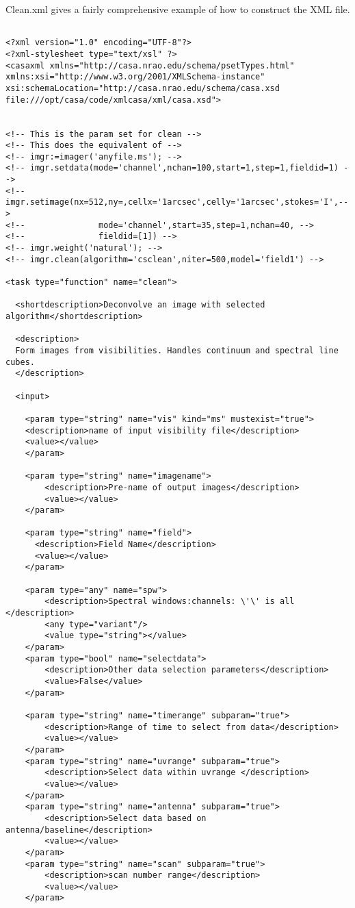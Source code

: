 Clean.xml gives a fairly comprehensive example of how to construct the
XML file.
\begin{verbatim}

<?xml version="1.0" encoding="UTF-8"?>
<?xml-stylesheet type="text/xsl" ?>
<casaxml xmlns="http://casa.nrao.edu/schema/psetTypes.html"
xmlns:xsi="http://www.w3.org/2001/XMLSchema-instance"
xsi:schemaLocation="http://casa.nrao.edu/schema/casa.xsd
file:///opt/casa/code/xmlcasa/xml/casa.xsd">


<!-- This is the param set for clean -->
<!-- This does the equivalent of -->
<!-- imgr:=imager('anyfile.ms'); -->
<!-- imgr.setdata(mode='channel',nchan=100,start=1,step=1,fieldid=1) -->
<!-- imgr.setimage(nx=512,ny=,cellx='1arcsec',celly='1arcsec',stokes='I',-->
<!--               mode='channel',start=35,step=1,nchan=40, -->
<!--               fieldid=[1]) -->
<!-- imgr.weight('natural'); -->
<!-- imgr.clean(algorithm='csclean',niter=500,model='field1') -->

<task type="function" name="clean">

  <shortdescription>Deconvolve an image with selected algorithm</shortdescription>

  <description>
  Form images from visibilities. Handles continuum and spectral line cubes.
  </description>

  <input>

    <param type="string" name="vis" kind="ms" mustexist="true">
    <description>name of input visibility file</description>
    <value></value>
    </param>

    <param type="string" name="imagename">
	    <description>Pre-name of output images</description>
	    <value></value>
    </param>

    <param type="string" name="field">
      <description>Field Name</description>
      <value></value>
    </param>

    <param type="any" name="spw">
	    <description>Spectral windows:channels: \'\' is all </description>
	    <any type="variant"/>
	    <value type="string"></value>
    </param>
    <param type="bool" name="selectdata">
	    <description>Other data selection parameters</description>
	    <value>False</value>
    </param>
    
    <param type="string" name="timerange" subparam="true">
	    <description>Range of time to select from data</description>
	    <value></value>
    </param>
    <param type="string" name="uvrange" subparam="true">
	    <description>Select data within uvrange </description>
	    <value></value>
    </param>
    <param type="string" name="antenna" subparam="true">
	    <description>Select data based on antenna/baseline</description>
	    <value></value>
    </param>
    <param type="string" name="scan" subparam="true">
	    <description>scan number range</description>
	    <value></value>
    </param>
    


\end{verbatim}
